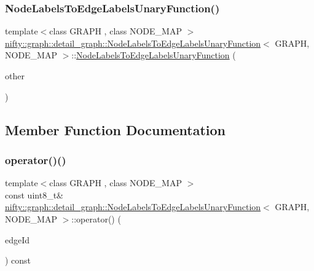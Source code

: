 \subsubsection{\texorpdfstring{Node\+Labels\+To\+Edge\+Labels\+Unary\+Function()}{NodeLabelsToEdgeLabelsUnaryFunction()}\hspace{0.1cm}{\footnotesize\ttfamily [2/2]}}
{\footnotesize\ttfamily template$<$class G\+R\+A\+PH , class N\+O\+D\+E\+\_\+\+M\+AP $>$ \\
\hyperlink{classnifty_1_1graph_1_1detail__graph_1_1NodeLabelsToEdgeLabelsUnaryFunction}{nifty\+::graph\+::detail\+\_\+graph\+::\+Node\+Labels\+To\+Edge\+Labels\+Unary\+Function}$<$ G\+R\+A\+PH, N\+O\+D\+E\+\_\+\+M\+AP $>$\+::\hyperlink{classnifty_1_1graph_1_1detail__graph_1_1NodeLabelsToEdgeLabelsUnaryFunction}{Node\+Labels\+To\+Edge\+Labels\+Unary\+Function} (\begin{DoxyParamCaption}\item[{const \hyperlink{classnifty_1_1graph_1_1detail__graph_1_1NodeLabelsToEdgeLabelsUnaryFunction}{Node\+Labels\+To\+Edge\+Labels\+Unary\+Function}$<$ G\+R\+A\+PH, N\+O\+D\+E\+\_\+\+M\+AP $>$ \&}]{other }\end{DoxyParamCaption})\hspace{0.3cm}{\ttfamily [inline]}}



\subsection{Member Function Documentation}
\mbox{\label{classnifty_1_1graph_1_1detail__graph_1_1NodeLabelsToEdgeLabelsUnaryFunction_a0e986e012abec9583a858ac3d3c882d7}} 
\subsubsection{\texorpdfstring{operator()()}{operator()()}}
{\footnotesize\ttfamily template$<$class G\+R\+A\+PH , class N\+O\+D\+E\+\_\+\+M\+AP $>$ \\
const uint8\+\_\+t\& \hyperlink{classnifty_1_1graph_1_1detail__graph_1_1NodeLabelsToEdgeLabelsUnaryFunction}{nifty\+::graph\+::detail\+\_\+graph\+::\+Node\+Labels\+To\+Edge\+Labels\+Unary\+Function}$<$ G\+R\+A\+PH, N\+O\+D\+E\+\_\+\+M\+AP $>$\+::operator() (\begin{DoxyParamCaption}\item[{const int64\+\_\+t}]{edge\+Id }\end{DoxyParamCaption}) const\hspace{0.3cm}{\ttfamily [inline]}}



